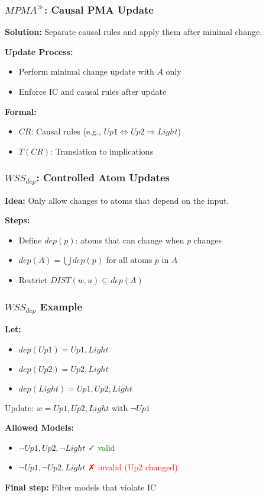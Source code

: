 \documentclass{beamer}
\begin{document}
\begin{frame}
\frametitle{$MPMA^{\gg}$: Causal PMA Update}
\textbf{Solution:} Separate causal rules and apply them after minimal change.

\textbf{Update Process:}
\begin{itemize}
\item Perform minimal change update with $A$ only
\item Enforce IC and causal rules after update
\end{itemize}

\textbf{Formal:}



\begin{itemize}
\item $CR$: Causal rules (e.g., $Up1 \Leftrightarrow Up2 \Rightarrow Light$)
\item $T(CR)$: Translation to implications
\end{itemize}
\end{frame}

\begin{frame}
\frametitle{$WSS_{dep}$: Controlled Atom Updates}
\textbf{Idea:} Only allow changes to atoms that depend on the input.

\textbf{Steps:}
\begin{itemize}
\item Define $dep(p)$: atoms that can change when $p$ changes
\item $dep(A) = \bigcup dep(p)$ for all atoms $p$ in $A$
\item Restrict $DIST(w, u) \subseteq dep(A)$
\end{itemize}
\end{frame}


\begin{frame}
\frametitle{$WSS_{dep}$ Example}
\textbf{Let:}
\begin{itemize}
\item $dep(Up1) = {Up1, Light}$
\item $dep(Up2) = {Up2, Light}$
\item $dep(Light) = {Up1, Up2, Light}$
\end{itemize}

Update: $w = {Up1, Up2, Light}$ with $\neg Up1$

\textbf{Allowed Models:}
\begin{itemize}
\item ${\neg Up1, Up2, \neg Light}$ \textcolor{green}{✓ valid}
\item ${\neg Up1, \neg Up2, Light}$ \textcolor{red}{✗ invalid (Up2 changed)}
\end{itemize}

\textbf{Final step:} Filter models that violate IC
\end{frame}
\end{document}
